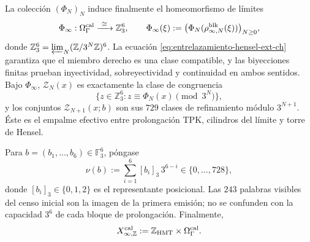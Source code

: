 La colección \((\Phi_N)_N\) induce finalmente el homeomorfismo de límites
\begin{equation}
 \Phi_\infty:\Omega_\Gamma^{\rm cal}
 \xrightarrow{\ \cong\ }\mathbb Z_3^6,\qquad
 \Phi_\infty(\xi):=
 \bigl(\Phi_N(\rho^{\rm blk}_{\infty,N}(\xi))\bigr)_{N\ge0},
 \label{eq:phi-infinito-hensel-ext-ch}
\end{equation}
donde
\(\mathbb Z_3^6=\varprojlim_N(\mathbb Z/3^N\mathbb Z)^6\).
La ecuación \eqref{eq:entrelazamiento-hensel-ext-ch} garantiza que el miembro
derecho es una clase compatible, y las biyecciones finitas prueban
inyectividad, sobreyectividad y continuidad en ambos sentidos. Bajo
\(\Phi_\infty\), \(\mathscr Z_N(x)\) es exactamente la clase de congruencia
\[
 \{z\in\mathbb Z_3^6:z\equiv\Phi_N(x)\pmod{3^N}\},
\]
y los conjuntos \(\mathscr Z_{N+1}(x;b)\) son sus \(729\) clases de refinamiento
módulo \(3^{N+1}\). Éste es el empalme efectivo entre prolongación TPK,
cilindros del límite y torre de Hensel.

Para \(b=(b_1,\ldots,b_6)\in\mathbb F_3^6\), póngase
\[
 \nu(b):=\sum_{i=1}^{6}[b_i]_3\,3^{6-i}
 \in\{0,\ldots,728\},
\tag{40c$_0$}
\label{eq:valor-bloque-ch}
\]
donde \([b_i]_3\in\{0,1,2\}\) es el representante posicional. Las
\(243\) palabras visibles del censo inicial son la imagen de la primera
emisión; no se confunden con la capacidad \(3^6\) de cada bloque de
prolongación. Finalmente,
\[
 X_{\infty,\mathbb Z}^{\rm cal}
 :=\mathbb Z_{\rm HMT}\times\Omega_\Gamma^{\rm cal}.
\]
